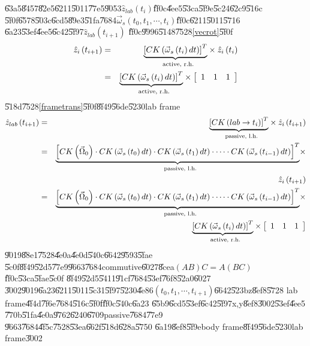 \documentclass[12pt]{article}
\begin{document}
\U{63a5}\U{8457}\U{82e5}\U{6211}\U{5011}\U{77e5}\U{9053}$\hat{z}_{lab}\left(
t_{i}\right) $\U{ff0c}\U{4ee5}\U{53ca}\U{5f9e}\U{5c24}\U{62c9}\U{516c}%
\U{5f0f}\U{6578}\U{503c}\U{6cd5}\U{89e3}\U{51fa}\U{7684}$\vec{\omega}%
_{s}\left( t_{0},t_{1},\cdots ,t_{i}\right) $\U{ff0c}\U{6211}\U{5011}\U{5716}%
\U{6a23}\U{53ef}\U{4ee5}\U{6c42}\U{5f97}$\hat{z}_{lab}\left( t_{i+1}\right) $%
\U{ff0c}\U{9996}\U{5148}\U{7528}\ref{vecrot}\U{5f0f}%
\begin{eqnarray*}
\hat{z}_{i}\left( t_{i+1}\right) &=&\underset{\text{active, r.h.}}{%
\underbrace{\left[ CK\left( \vec{\omega}_{s}\left( t_{i}\right) dt\right) %
\right] ^{T}}}\times \hat{z}_{i}\left( t_{i}\right) \\
&=&\underset{\text{active, r.h.}}{\underbrace{\left[ CK\left( \vec{\omega}%
_{s}\left( t_{i}\right) dt\right) \right] ^{T}}}\times \left[ 
\begin{array}{ccc}
1 & 1 & 1%
\end{array}%
\right]
\end{eqnarray*}%
\U{518d}\U{7528}\ref{frametrans}\U{5f0f}\U{8f49}\U{56de}\U{5230}lab frame%
\begin{eqnarray*}
\hat{z}_{lab}\left( t_{i+1}\right) &=&\underset{\text{passive, l.h.}}{%
\underbrace{\left[ CK\left( lab\rightarrow t_{i}\right) \right] ^{T}}}\times 
\hat{z}_{i}\left( t_{i+1}\right) \\
&=&\underset{\text{passive, l.h.}}{\underbrace{\left[ CK\left( \vec{\Omega}%
_{0}\right) \cdot CK\left( \vec{\omega}_{s}\left( t_{0}\right) dt\right)
\cdot CK\left( \vec{\omega}_{s}\left( t_{1}\right) dt\right) \cdot \cdots
\cdot CK\left( \vec{\omega}_{s}\left( t_{i-1}\right) dt\right) \right] ^{T}}}%
\times \\
&&\hat{z}_{i}\left( t_{i+1}\right) \\
&=&\underset{\text{passive, l.h.}}{\underbrace{\left[ CK\left( \vec{\Omega}%
_{0}\right) \cdot CK\left( \vec{\omega}_{s}\left( t_{0}\right) dt\right)
\cdot CK\left( \vec{\omega}_{s}\left( t_{1}\right) dt\right) \cdot \cdots
\cdot CK\left( \vec{\omega}_{s}\left( t_{i-1}\right) dt\right) \right] ^{T}}}%
\times \\
&&\underset{\text{active, r.h.}}{\underbrace{\left[ CK\left( \vec{\omega}%
_{s}\left( t_{i}\right) dt\right) \right] ^{T}}}\times \left[ 
\begin{array}{ccc}
1 & 1 & 1%
\end{array}%
\right]
\end{eqnarray*}%
\U{9019}\U{88e1}\U{7528}\U{4e0a}\U{4e0d}\U{540c}\U{6642}\U{9593}\U{5fae}%
\U{5c0f}\U{8f49}\U{52d5}\U{77e9}\U{9663}\U{7684}commutive\U{6027}\U{8cea}$%
\left( AB\right) C=A\left( BC\right) $\U{ff0c}\U{53ca}\U{5fae}\U{5c0f}%
\U{8f49}\U{52d5}\U{5411}\U{91cf}\U{7684}\U{53ef}\U{76f8}\U{52a0}\U{6027}%
\U{3002}\U{9019}\U{6a23}\U{6211}\U{5011}\U{5c31}\U{5f97}\U{5230}\U{4e86}$%
\left( t_{0},t_{1},\cdots ,t_{i+1}\right) $\U{6642}\U{523b}z\U{8ef8}\U{5728}%
lab frame\U{4f4d}\U{7f6e}\U{7684}\U{516c}\U{5f0f}\U{ff0c}\U{540c}\U{6a23}%
\U{65b9}\U{6cd5}\U{53ef}\U{6c42}\U{5f97}x,y\U{8ef8}\U{3002}\U{53ef}\U{4ee5}%
\U{770b}\U{51fa}\U{4e0a}\U{9762}\U{6240}\U{6709}passive\U{7684}\U{77e9}%
\U{9663}\U{7684}\U{4f5c}\U{7528}\U{53ea}\U{662f}\U{518d}\U{628a}\U{5750}%
\U{6a19}\U{8ef8}\U{5f9e}body frame\U{8f49}\U{56de}\U{5230}lab frame\U{3002}
\end{document}
